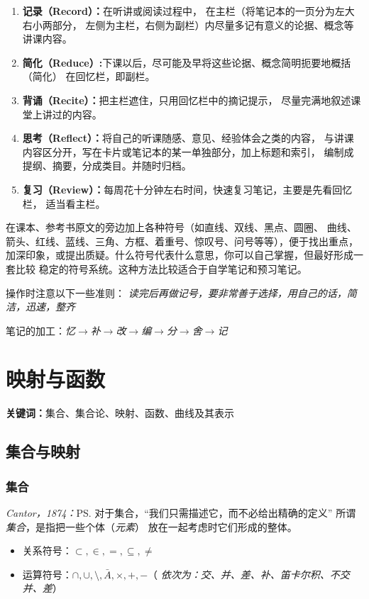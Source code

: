 \begin{shaded}
\begin{center}
	\end{center}
	
	\begin{enumerate}[Step1]
	  \item {\bf 记录（Record）：}在听讲或阅读过程中，
	  在主栏（将笔记本的一页分为左大右小两部分，
	  左侧为主栏，右侧为副栏）内尽量多记有意义的论据、概念等讲课内容。
	  \item {\bf 简化（Reduce）:}下课以后，尽可能及早将这些论据、概念简明扼要地概括（简化）
	  在回忆栏，即副栏。
	  \item {\bf 背诵（Recite）：}把主栏遮住，只用回忆栏中的摘记提示，
	  尽量完满地叙述课堂上讲过的内容。
	  \item {\bf 思考（Reflect）：}将自己的听课随感、意见、经验体会之类的内容，
	  与讲课内容区分开，写在卡片或笔记本的某一单独部分，加上标题和索引，
	  编制成提纲、摘要，分成类目。并随时归档。
	  \item {\bf 复习（Review）：}每周花十分钟左右时间，快速复习笔记，主要是先看回忆栏，
	  适当看主栏。
	\end{enumerate}
	
	在课本、参考书原文的旁边加上各种符号（如直线、双线、黑点、圆圈、
	曲线、箭头、红线、蓝线、三角、方框、着重号、惊叹号、问号等等），便于找出重点，
	加深印象，或提出质疑。什么符号代表什么意思，你可以自己掌握，但最好形成一套比较
	稳定的符号系统。这种方法比较适合于自学笔记和预习笔记。
	
	操作时注意以下一些准则：
	{\it 读完后再做记号，要非常善于选择，用自己的话，简洁，迅速，整齐}
	
	笔记的加工：{\it 忆$\to$补$\to$改$\to$编$\to$分$\to$舍$\to$记}	
\end{shaded}

\chapter{映射与函数}

{\bf 关键词：}集合、集合论、映射、函数、曲线及其表示

\section{集合与映射}

\subsection{集合}

{\it Cantor，1874：}\ps{对于集合，“我们只需描述它，而不必给出精确的定义”}
所谓{\it 集合}，是指把一些个体（{\it 元素}） 放在一起考虑时它们形成的整体。
\begin{itemize}
  \item 关系符号：$\subset, \in, =, \subseteq, \neq$
  \item 运算符号：$\cap,\cup, \setminus, \bar{A}, \times, +, - $\quad （{\it
  依次为：交、并、差、补、笛卡尔积、不交并、差}）
\end{itemize}
	
